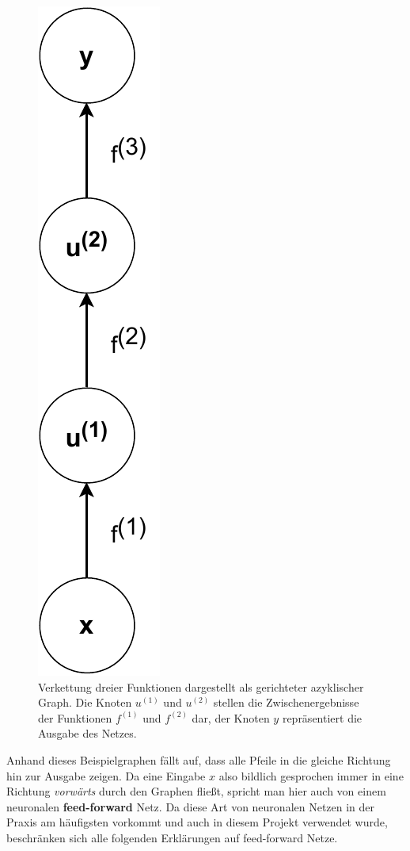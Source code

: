 \begin{figure}[h]
    \centering
    \includegraphics[height=0.3\textheight]{abbildungen/basic_network_graph}
    \caption{Verkettung dreier Funktionen dargestellt als
        gerichteter azyklischer Graph. Die Knoten $u^{(1)}$ und
        $u^{(2)}$ stellen die Zwischenergebnisse der Funktionen
        $f^{(1)}$ und $f^{(2)}$ dar, der Knoten $y$ repr\"asentiert
        die Ausgabe des Netzes.}
    \label{fig:einfacher-graph}
\end{figure}

Anhand dieses Beispielgraphen f\"allt auf, dass alle Pfeile in die
gleiche Richtung hin zur Ausgabe zeigen. Da eine Eingabe $x$ also
bildlich gesprochen immer in eine Richtung \textit{vorw\"arts} durch
den Graphen flie{\ss}t, spricht man hier auch von einem neuronalen
\textbf{feed-forward} Netz. Da diese Art von neuronalen Netzen in der
Praxis am h\"aufigsten vorkommt und auch in diesem Projekt verwendet
wurde, beschr\"anken sich alle folgenden Erkl\"arungen auf
feed-forward Netze.

